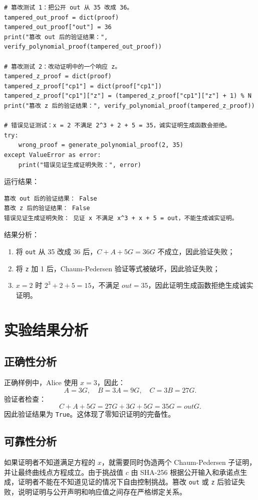 \documentclass[a4paper]{article}
\begin{document}
	\begin{lstlisting}[caption={篡改证明和错误见证测试}]
# 篡改测试 1：把公开 out 从 35 改成 36。
tampered_out_proof = dict(proof)
tampered_out_proof["out"] = 36
print("篡改 out 后的验证结果：", verify_polynomial_proof(tampered_out_proof))

# 篡改测试 2：改动证明中的一个响应 z。
tampered_z_proof = dict(proof)
tampered_z_proof["cp1"] = dict(proof["cp1"])
tampered_z_proof["cp1"]["z"] = (tampered_z_proof["cp1"]["z"] + 1) % N
print("篡改 z 后的验证结果：", verify_polynomial_proof(tampered_z_proof))

# 错误见证测试：x = 2 不满足 2^3 + 2 + 5 = 35，诚实证明生成函数会拒绝。
try:
    wrong_proof = generate_polynomial_proof(2, 35)
except ValueError as error:
    print("错误见证生成证明失败：", error)
	\end{lstlisting}
	
	运行结果：
	\begin{lstlisting}[caption={篡改测试运行结果}]
篡改 out 后的验证结果： False
篡改 z 后的验证结果： False
错误见证生成证明失败： 见证 x 不满足 x^3 + x + 5 = out，不能生成诚实证明。
	\end{lstlisting}
	
	结果分析：
	\begin{enumerate}
		\item 将 \texttt{out} 从 35 改成 36 后，\(C+A+5G=36G\) 不成立，因此验证失败；
		\item 将 \texttt{z} 加 1 后，Chaum-Pedersen 验证等式被破坏，因此验证失败；
		\item \(x=2\) 时 \(2^{3}+2+5=15\)，不满足 \(out=35\)，因此证明生成函数拒绝生成诚实证明。
	\end{enumerate}
	
	\section{实验结果分析}
	\subsection{正确性分析}
	正确样例中，Alice 使用 \(x=3\)，因此：
	\[
		A=3G,\quad B=3A=9G,\quad C=3B=27G.
	\]
	验证者检查：
	\[
		C+A+5G=27G+3G+5G=35G=outG.
	\]
	因此验证结果为 \texttt{True}。这体现了零知识证明的完备性。
	
	\subsection{可靠性分析}
	如果证明者不知道满足方程的 \(x\)，就需要同时伪造两个 Chaum-Pedersen 子证明，并让最终曲线点方程成立。由于挑战值 \(c\) 由 SHA-256 根据公开输入和承诺点生成，证明者不能在不知道见证的情况下自由控制挑战。篡改 \texttt{out} 或 \texttt{z} 后验证失败，说明证明与公开声明和响应值之间存在严格绑定关系。
	
\end{document}
